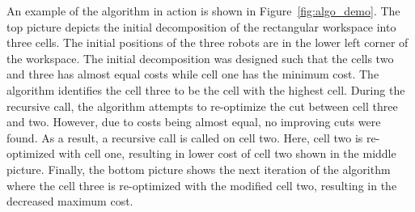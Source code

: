 \documentclass[../main.tex]{subfiles}
\begin{document}
An example of the algorithm in action is shown in Figure~\ref{fig:algo_demo}. The top picture depicts the initial decomposition of the rectangular workspace into three cells. The initial positions of the three robots are in the lower left corner of the workspace. The initial decomposition was designed such that the cells two and three has almost equal costs while cell one has the minimum cost. The algorithm identifies the cell three to be the cell with the highest cell. During the recursive call, the algorithm attempts to re-optimize the cut between cell three and two. However, due to costs being almost equal, no improving cuts were found. As a result, a recursive call is called on cell two. Here, cell two is re-optimized with cell one, resulting in lower cost of cell two shown in the middle picture. Finally, the bottom picture shows the next iteration of the algorithm where the cell three is re-optimized with the modified cell two, resulting in the decreased maximum cost. 
\end{document}
